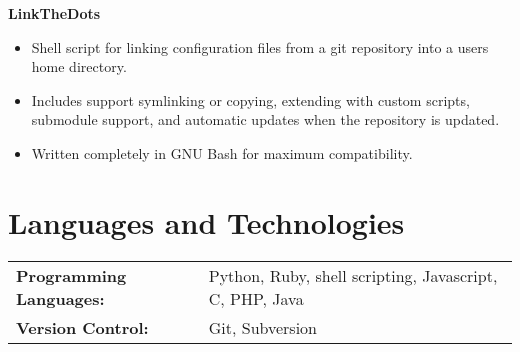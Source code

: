 \documentclass[centered,overlapped]{res}
\begin{document}
\begin{resume}
  {\bf LinkTheDots}
  \begin{itemize} \itemsep -2pt %
    \item Shell script for linking configuration files from a git repository
      into a users home directory.
    \item Includes support symlinking or copying, extending with custom
      scripts, submodule support, and automatic updates when the repository is
      updated.
    \item Written completely in GNU Bash for maximum compatibility.
  \end{itemize}


\section{Languages and Technologies}
\noindent
\begin{tabular}{@{} l l}
  \textbf{Programming Languages:} & Python, Ruby, shell scripting, Javascript,
    C, PHP, Java \\
  \textbf{Version Control:} & Git, Subversion \\
\end{tabular}

\end{resume}
\end{document}
